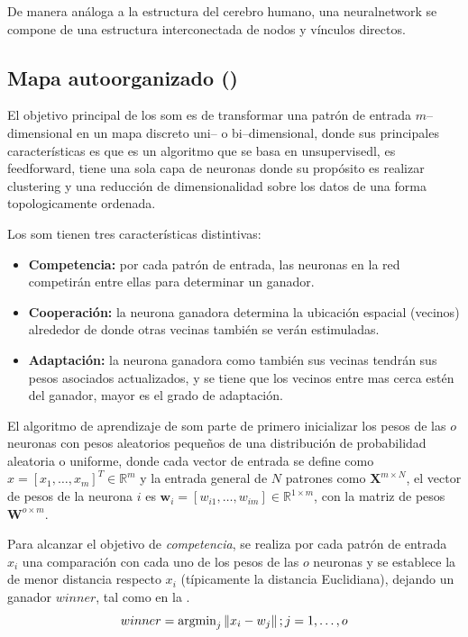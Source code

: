 De manera análoga a la estructura del cerebro humano, una \gls{neuralnetwork} se compone de una estructura interconectada de nodos y vínculos directos.

\subsection{Mapa autoorganizado ()} \label{subsec:SOM}
El objetivo principal de los \gls{som} es de transformar una patrón de entrada $m$--dimensional en un mapa discreto uni-- o bi--dimensional, donde sus principales características es que es un algoritmo que se basa en \gls{unsupervisedl}, es \gls{feedforward}, tiene una sola capa de neuronas donde su propósito es realizar \gls{clustering} y una reducción de dimensionalidad sobre los datos de una forma topologicamente ordenada.

Los \gls{som} tienen tres características distintivas:
\begin{itemize}
\item {\bf Competencia:} por cada patrón de entrada, las neuronas en la red competirán entre ellas para determinar un ganador.
\item {\bf Cooperación:} la neurona ganadora determina la ubicación espacial (vecinos) alrededor de donde otras vecinas también se verán estimuladas.
\item {\bf Adaptación:} la neurona ganadora como también sus vecinas tendrán sus pesos asociados actualizados, y se tiene que los vecinos entre mas cerca estén del ganador, mayor es el grado de adaptación.
\end{itemize}

El algoritmo de aprendizaje de \gls{som} parte de primero inicializar los pesos de las $o$ neuronas con pesos aleatorios pequeños de una distribución de probabilidad aleatoria o uniforme, donde cada vector de entrada se define como $x = [x_1, \ldots, x_m]^{T} \in \mathbb{R}^{m}$ y la entrada general de $N$ patrones como $\mathbf{X}^{m \times N}$, el vector de pesos de la neurona $i$ es $\mathbf{w}_i = [w_{i1}, \ldots, w_{im}] \in \mathbb{R}^{1 \times m}$, con la matriz de pesos $\mathbf{W}^{o \times m}$.

Para alcanzar el objetivo de \emph{competencia}, se realiza por cada patrón de entrada $x_i$ una comparación con cada uno de los pesos de las $o$ neuronas y se establece la de menor distancia respecto $x_i$ (típicamente la distancia Euclidiana), dejando un ganador $winner$, tal como en la .
\begin{equation} \label{eq:som-competition}
  winner = \text{argmin}_j \left\lVert x_i - w_j\right\rVert ; j = 1, \ldots,o
\end{equation}

